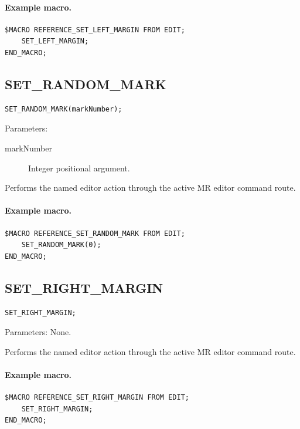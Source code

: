 \documentclass[a4paper,10pt,twoside,openany]{book}
\newenvironment{mrmacextension}{\begin{changebar}}{\end{changebar}}
\begin{document}
\paragraph{Example macro.}
\begin{verbatim}
$MACRO REFERENCE_SET_LEFT_MARGIN FROM EDIT;
    SET_LEFT_MARGIN;
END_MACRO;
\end{verbatim}

\begin{mrmacextension}
\label{prim:procedure-set-random-mark}
\subsection*{SET\_RANDOM\_MARK}
\begin{verbatim}
SET_RANDOM_MARK(markNumber);
\end{verbatim}
Parameters:
\begin{description}
\item[markNumber] Integer positional argument.
\end{description}

Performs the named editor action through the active MR editor command route.

\paragraph{Example macro.}
\begin{verbatim}
$MACRO REFERENCE_SET_RANDOM_MARK FROM EDIT;
    SET_RANDOM_MARK(0);
END_MACRO;
\end{verbatim}
\end{mrmacextension}

\begin{mrmacextension}
\label{prim:procedure-set-right-margin}
\subsection*{SET\_RIGHT\_MARGIN}
\begin{verbatim}
SET_RIGHT_MARGIN;
\end{verbatim}
Parameters: None.

Performs the named editor action through the active MR editor command route.

\paragraph{Example macro.}
\begin{verbatim}
$MACRO REFERENCE_SET_RIGHT_MARGIN FROM EDIT;
    SET_RIGHT_MARGIN;
END_MACRO;
\end{verbatim}
\end{mrmacextension}
\end{document}
